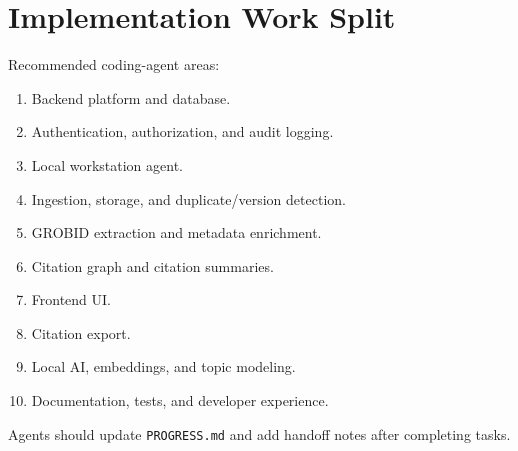 \section{Implementation Work Split}

Recommended coding-agent areas:

\begin{enumerate}[noitemsep]
  \item Backend platform and database.
  \item Authentication, authorization, and audit logging.
  \item Local workstation agent.
  \item Ingestion, storage, and duplicate/version detection.
  \item GROBID extraction and metadata enrichment.
  \item Citation graph and citation summaries.
  \item Frontend UI.
  \item Citation export.
  \item Local AI, embeddings, and topic modeling.
  \item Documentation, tests, and developer experience.
\end{enumerate}

Agents should update \texttt{PROGRESS.md} and add handoff notes after completing tasks.
